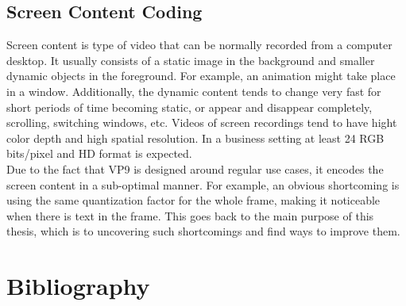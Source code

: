 \documentclass[a4paper,11pt,oneside]{article}
\begin{document}
\subsection{Screen Content Coding}
\indent Screen content is type of video that can be normally recorded from a computer desktop. It usually consists of a static image in the background and smaller dynamic objects in the foreground. For example, an animation might take place in a window. Additionally, the dynamic content tends to change very fast for short periods of time becoming static, or appear and disappear completely, scrolling, switching windows, etc. 
Videos of screen recordings tend to have hight color depth and high spatial resolution. In a business setting at least 24 RGB bits/pixel and HD format is expected. \\
Due to the fact that VP9 is designed around regular use cases, it encodes the screen content in a sub-optimal manner. For example, an obvious shortcoming is using the same quantization factor for the whole frame, making it noticeable when there is text in the frame. This goes back to the main purpose of this thesis, which is to uncovering such shortcomings and find ways to improve them.  





\newpage
\section*{Bibliography}
\printbibliography
\end{document}

